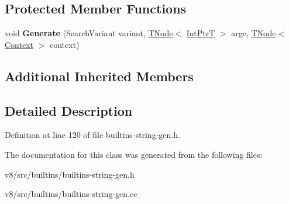 \subsection*{Protected Member Functions}
\begin{DoxyCompactItemize}
\item 
\mbox{\label{classv8_1_1internal_1_1StringIncludesIndexOfAssembler_a025f7c08724b703193935101d8328044}} 
void {\bfseries Generate} (Search\+Variant variant, \mbox{\hyperlink{classv8_1_1internal_1_1compiler_1_1TNode}{T\+Node}}$<$ \mbox{\hyperlink{structv8_1_1internal_1_1IntPtrT}{Int\+PtrT}} $>$ argc, \mbox{\hyperlink{classv8_1_1internal_1_1compiler_1_1TNode}{T\+Node}}$<$ \mbox{\hyperlink{classv8_1_1internal_1_1Context}{Context}} $>$ context)
\end{DoxyCompactItemize}
\subsection*{Additional Inherited Members}


\subsection{Detailed Description}


Definition at line 120 of file builtins-\/string-\/gen.\+h.



The documentation for this class was generated from the following files\+:\begin{DoxyCompactItemize}
\item 
v8/src/builtins/builtins-\/string-\/gen.\+h\item 
v8/src/builtins/builtins-\/string-\/gen.\+cc\end{DoxyCompactItemize}
